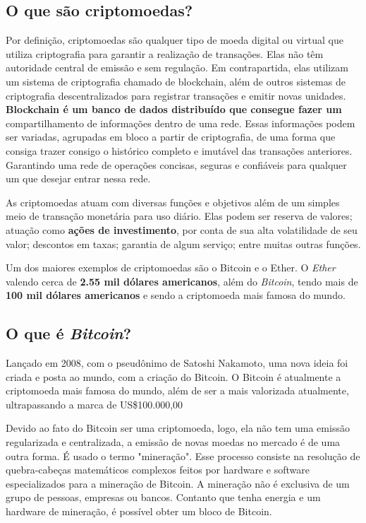 \subsection{\textbf{O que são criptomoedas?}}

Por definição, criptomoedas são qualquer tipo de moeda digital ou virtual que utiliza criptografia para garantir a realização de transações. Elas não têm autoridade central de emissão e sem regulação. Em contrapartida, elas utilizam um sistema de criptografia chamado de blockchain, além de outros sistemas de criptografia descentralizados para registrar transações e emitir novas unidades. 
\textbf{Blockchain é um banco de dados distribuído que consegue fazer um} compartilhamento de informações dentro de uma rede. Essas informações podem ser variadas, agrupadas em bloco a partir de criptografia, de uma forma que consiga trazer consigo o histórico completo e imutável das transações anteriores. Garantindo uma rede de operações concisas, seguras e confiáveis para qualquer um que desejar entrar nessa rede.

As criptomoedas atuam com diversas funções e objetivos além de um simples meio de transação monetária para uso diário. Elas podem ser reserva de valores; atuação como \textbf{ações de investimento}, por conta de sua alta volatilidade de seu valor; descontos em taxas; garantia de algum serviço; entre muitas outras funções.

Um dos maiores exemplos de criptomoedas são o Bitcoin e o Ether. O \textit{Ether} valendo cerca de \textbf{2.55 mil dólares americanos}, além do \textit{Bitcoin}, tendo mais de \textbf{100 mil dólares americanos} e sendo a criptomoeda mais famosa do mundo.

\subsection{\textbf{O que é \textit{Bitcoin}?}}
Lançado em 2008, com o pseudônimo de Satoshi Nakamoto, uma nova ideia foi criada e posta ao mundo, com a criação do Bitcoin. O Bitcoin é atualmente a criptomoeda mais famosa do mundo, além de ser a mais valorizada atualmente, ultrapassando a marca de US\$100.000,00 

Devido ao fato do Bitcoin ser uma criptomoeda, logo, ela não tem uma emissão regularizada e centralizada, a emissão de novas moedas no mercado é de uma outra forma. É usado o termo "mineração". Esse processo consiste na resolução de quebra-cabeças matemáticos complexos feitos por hardware e software especializados para a mineração de Bitcoin. A mineração não é exclusiva de um grupo de pessoas, empresas ou bancos. Contanto que tenha energia e um hardware de mineração, é possível obter um bloco de Bitcoin.

